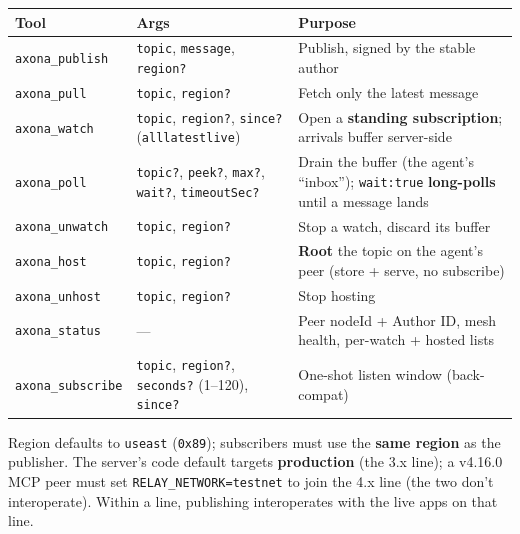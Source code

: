 \documentclass[
  nobib]{tufte-handout}
\newcounter{none} %
\begin{document}
{\def\LTcaptype{none} %
\begin{longtable}[]{@{}
  >{\raggedright\arraybackslash}p{}
  >{\raggedright\arraybackslash}p{}
  >{\raggedright\arraybackslash}p{}@{}}
\toprule\noalign{}
\begin{minipage}[b]{\linewidth}\raggedright
Tool
\end{minipage} & \begin{minipage}[b]{\linewidth}\raggedright
Args
\end{minipage} & \begin{minipage}[b]{\linewidth}\raggedright
Purpose
\end{minipage} \\
\midrule\noalign{}
\endhead
\bottomrule\noalign{}
\endlastfoot
\texttt{axona\_publish} & \texttt{topic}, \texttt{message},
\texttt{region?} & Publish, signed by the stable author \\
\texttt{axona\_pull} & \texttt{topic}, \texttt{region?} & Fetch only the
latest message \\
\texttt{axona\_watch} & \texttt{topic}, \texttt{region?},
\texttt{since?}
(\texttt{all}\textbar{}\texttt{latest}\textbar{}\texttt{live}) & Open a
\textbf{standing subscription}; arrivals buffer server-side \\
\texttt{axona\_poll} & \texttt{topic?}, \texttt{peek?}, \texttt{max?},
\texttt{wait?}, \texttt{timeoutSec?} & Drain the buffer (the agent's
``inbox''); \texttt{wait:true} \textbf{long-polls} until a message
lands \\
\texttt{axona\_unwatch} & \texttt{topic}, \texttt{region?} & Stop a
watch, discard its buffer \\
\texttt{axona\_host} & \texttt{topic}, \texttt{region?} & \textbf{Root}
the topic on the agent's peer (store + serve, no subscribe) \\
\texttt{axona\_unhost} & \texttt{topic}, \texttt{region?} & Stop
hosting \\
\texttt{axona\_status} & --- & Peer nodeId + Author ID, mesh health,
per-watch + hosted lists \\
\texttt{axona\_subscribe} & \texttt{topic}, \texttt{region?},
\texttt{seconds?} (1--120), \texttt{since?} & One-shot listen window
(back-compat) \\
\end{longtable}
}

Region defaults to \texttt{useast} (\texttt{0x89}); subscribers must use
the \textbf{same region} as the publisher. The server's code default
targets \textbf{production} (the 3.x line); a v4.16.0 MCP peer must set
\texttt{RELAY\_NETWORK=testnet} to join the 4.x line (the two don't
interoperate). Within a line, publishing interoperates with the live
apps on that line.
\end{document}
